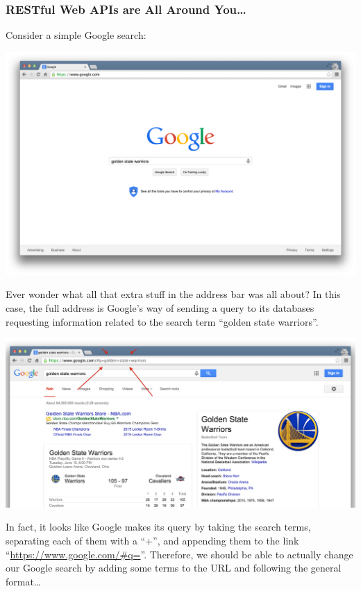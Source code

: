 \documentclass[]{book}
\begin{document}
\hypertarget{restful-web-apis-are-all-around-you}{%
\subsubsection*{RESTful Web APIs are All Around You\ldots{}}\label{restful-web-apis-are-all-around-you}}

Consider a simple Google search:

\begin{center}\includegraphics[width=0.7\linewidth]{img/google_search} \end{center}

Ever wonder what all that extra stuff in the address bar was all about? In this case, the full address is Google's way of sending a query to its databases requesting information related to the search term ``golden state warriors''.

\begin{center}\includegraphics[width=0.7\linewidth]{img/google_link} \end{center}

In fact, it looks like Google makes its query by taking the search terms, separating each of them with a ``+'', and appending them to the link ``\url{https://www.google.com/\#q=}''. Therefore, we should be able to actually change our Google search by adding some terms to the URL and following the general format\ldots{}
\end{document}
